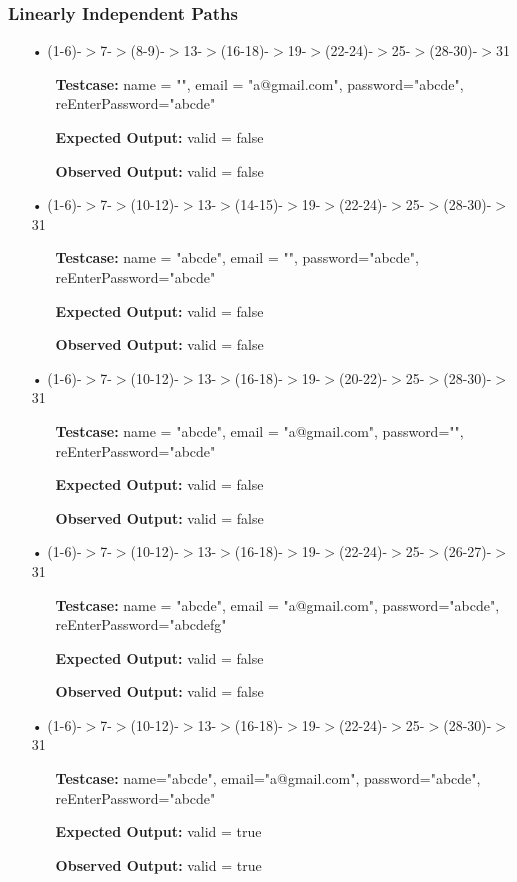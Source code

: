 \documentclass{scrreprt}
\begin{document}
\subsubsection{Linearly Independent Paths}
\begin{enumerate}
\item[•](1-6)-$>$7-$>$(8-9)-$>$13-$>$(16-18)-$>$19-$>$(22-24)-$>$25-$>$(28-30)-$>$31
\begin{itemize}
\item[]\textbf{Testcase: }name = "", email = "a@gmail.com", password="abcde", reEnterPassword="abcde"
\item[]\textbf{Expected Output: }valid = false
\item[]\textbf{Observed Output: }valid = false
\end{itemize}

\item[•](1-6)-$>$7-$>$(10-12)-$>$13-$>$(14-15)-$>$19-$>$(22-24)-$>$25-$>$(28-30)-$>$31
\begin{itemize}
\item[]\textbf{Testcase: }name = "abcde", email = "", password="abcde", reEnterPassword="abcde"
\item[]\textbf{Expected Output: }valid = false
\item[]\textbf{Observed Output: }valid = false
\end{itemize}

\item[•](1-6)-$>$7-$>$(10-12)-$>$13-$>$(16-18)-$>$19-$>$(20-22)-$>$25-$>$(28-30)-$>$31
\begin{itemize}
\item[]\textbf{Testcase: }name = "abcde", email = "a@gmail.com", password="", reEnterPassword="abcde"
\item[]\textbf{Expected Output: }valid = false
\item[]\textbf{Observed Output: }valid = false
\end{itemize}

\item[•](1-6)-$>$7-$>$(10-12)-$>$13-$>$(16-18)-$>$19-$>$(22-24)-$>$25-$>$(26-27)-$>$31
\begin{itemize}
\item[]\textbf{Testcase: }name = "abcde", email = "a@gmail.com", password="abcde", reEnterPassword="abcdefg"
\item[]\textbf{Expected Output: }valid = false
\item[]\textbf{Observed Output: }valid = false
\end{itemize}

\item[•](1-6)-$>$7-$>$(10-12)-$>$13-$>$(16-18)-$>$19-$>$(22-24)-$>$25-$>$(28-30)-$>$31
\begin{itemize}
\item[]\textbf{Testcase: }name="abcde", email="a@gmail.com", password="abcde", reEnterPassword="abcde"
\item[]\textbf{Expected Output: }valid = true
\item[]\textbf{Observed Output: }valid = true
\end{itemize}

\end{enumerate}	
\end{document}

